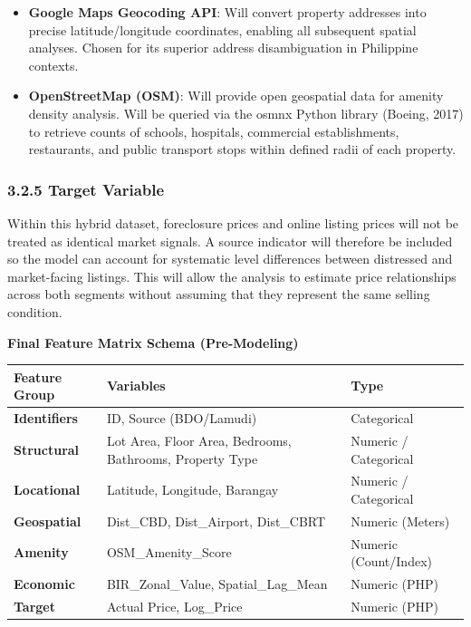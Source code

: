 \begin{itemize}
\item \textbf{Google Maps Geocoding API}: Will convert property addresses into precise latitude/longitude coordinates, enabling all subsequent spatial analyses. Chosen for its superior address disambiguation in Philippine contexts.
\item \textbf{OpenStreetMap (OSM)}: Will provide open geospatial data for amenity density analysis. Will be queried via the osmnx Python library (Boeing, 2017) to retrieve counts of schools, hospitals, commercial establishments, restaurants, and public transport stops within defined radii of each property.
\end{itemize}

\subsubsection{\texorpdfstring{\textbf{3.2.5 Target Variable}}{3.2.5 Target Variable}}\label{target-variable}

Within this hybrid dataset, foreclosure prices and online listing prices will not be treated as identical market signals. A source indicator will therefore be included so the model can account for systematic level differences between distressed and market-facing listings. This will allow the analysis to estimate price relationships across both segments without assuming that they represent the same selling condition.

\textbf{Final Feature Matrix Schema (Pre-Modeling)}

\begin{center}
\begin{tabular}{p{} p{} p{}}
\toprule
Feature Group & Variables & Type \\
\midrule
\textbf{Identifiers} & ID, Source (BDO/Lamudi) & Categorical \\
\textbf{Structural} & Lot Area, Floor Area, Bedrooms, Bathrooms, Property Type & Numeric / Categorical \\
\textbf{Locational} & Latitude, Longitude, Barangay & Numeric / Categorical \\
\textbf{Geospatial} & Dist\_CBD, Dist\_Airport, Dist\_CBRT & Numeric (Meters) \\
\textbf{Amenity} & OSM\_Amenity\_Score & Numeric (Count/Index) \\
\textbf{Economic} & BIR\_Zonal\_Value, Spatial\_Lag\_Mean & Numeric (PHP) \\
\textbf{Target} & Actual Price, Log\_Price & Numeric (PHP) \\
\bottomrule
\end{tabular}
\end{center}

